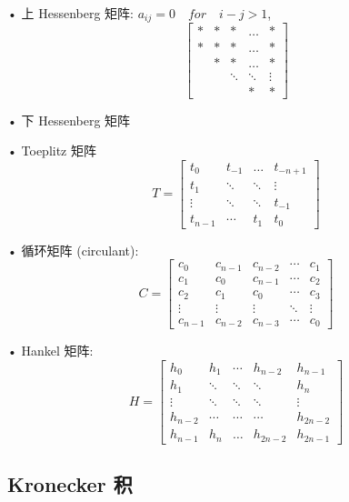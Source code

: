 \documentclass[12pt,a4paper]{article}
\begin{document}
• 上 Hessenberg 矩阵: $a_{ij} = 0\quad for\quad i − j > 1$,
$$
\left[\begin{array}{ccccc}{*} & {*} & {*} & {\dots} & {*} \\ {*} & {*} & {*} & {\dots} & {*} \\ { } & {*} & {*} & {\dots} & {*} \\ { } & { } & {\ddots} & {\ddots} & {\vdots}\\ { } & { } & { } & {*} & {*}\end{array}\right]
$$

• 下 Hessenberg 矩阵

• Toeplitz 矩阵
$$
T=\left[\begin{array}{cccc}{t_{0}} & {t_{-1}} & {\dots} & {t_{-n+1}} \\ {t_{1}} & {\ddots} & {\ddots} & {\vdots} \\ {\vdots} & {\ddots} & {\ddots} & {t_{-1}} \\ {t_{n-1}} & {\cdots} & {t_{1}} & {t_{0}}\end{array}\right]
$$

• 循环矩阵 (circulant):
$$
C=\left[\begin{array}{ccccc}{c_{0}} & {c_{n-1}} & {c_{n-2}} & {\cdots} & {c_{1}} \\ {c_{1}} & {c_{0}} & {c_{n-1}} & {\cdots} & {c_{2}} \\ {c_{2}} & {c_{1}} & {c_{0}} & {\cdots} & {c_{3}} \\ {\vdots} & {\vdots} & {\vdots} & {\ddots} & {\vdots} \\ {c_{n-1}} & {c_{n-2}} & {c_{n-3}} & {\cdots} & {c_{0}}\end{array}\right]
$$

• Hankel 矩阵:
$$
H=\left[\begin{array}{ccccc}{h_0} & {h_1} & {\cdots} & {h_{n-2}} & {h_{n-1}} \\ {h_1} & {\ddots} & {\ddots} & {\ddots} & {h_n}\\ {\vdots} & {\ddots} & {\ddots} & {\ddots} & {\vdots}  \\ {h_{n-2}} & {\cdots} & {\cdots} & {\cdots} & {h_{2n-2}} \\ {h_{n-1}} & {h_n} & {\dots} & {h_{2n-2}} & {h_{2n-1}}\end{array}\right]
$$

\subsection{Kronecker 积}
\end{document}
